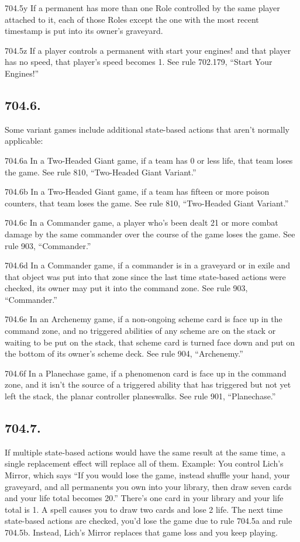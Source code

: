 704.5y If a permanent has more than one Role controlled by the same player attached to it, each of those Roles except the one with the most recent timestamp is put into its owner’s graveyard.

704.5z If a player controls a permanent with start your engines! and that player has no speed, that player’s speed becomes 1. See rule 702.179, “Start Your Engines!”

\subsection*{704.6.}
Some variant games include additional state-based actions that aren’t normally applicable:

704.6a In a Two-Headed Giant game, if a team has 0 or less life, that team loses the game. See rule 810, “Two-Headed Giant Variant.”

704.6b In a Two-Headed Giant game, if a team has fifteen or more poison counters, that team loses the game. See rule 810, “Two-Headed Giant Variant.”

704.6c In a Commander game, a player who’s been dealt 21 or more combat damage by the same commander over the course of the game loses the game. See rule 903, “Commander.”

704.6d In a Commander game, if a commander is in a graveyard or in exile and that object was put into that zone since the last time state-based actions were checked, its owner may put it into the command zone. See rule 903, “Commander.”

704.6e In an Archenemy game, if a non-ongoing scheme card is face up in the command zone, and no triggered abilities of any scheme are on the stack or waiting to be put on the stack, that scheme card is turned face down and put on the bottom of its owner’s scheme deck. See rule 904, “Archenemy.”

704.6f In a Planechase game, if a phenomenon card is face up in the command zone, and it isn’t the source of a triggered ability that has triggered but not yet left the stack, the planar controller planeswalks. See rule 901, “Planechase.”

\subsection*{704.7.}
If multiple state-based actions would have the same result at the same time, a single replacement effect will replace all of them.
Example: You control Lich’s Mirror, which says “If you would lose the game, instead shuffle your hand, your graveyard, and all permanents you own into your library, then draw seven cards and your life total becomes 20.” There’s one card in your library and your life total is 1. A spell causes you to draw two cards and lose 2 life. The next time state-based actions are checked, you’d lose the game due to rule 704.5a and rule 704.5b. Instead, Lich’s Mirror replaces that game loss and you keep playing.

